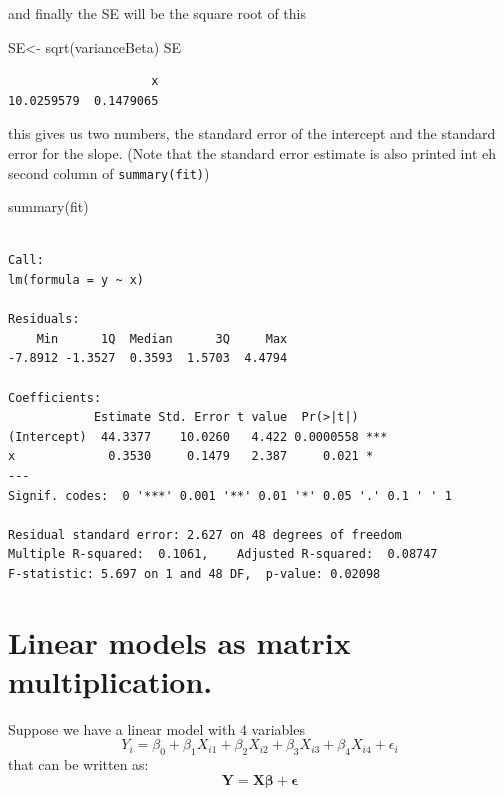 \documentclass[
  letterpaper,
  DIV=11,
  numbers=noendperiod]{scrartcl}
\newenvironment{Shaded}{\begin{snugshade}}{\end{snugshade}}
\newcommand{\FunctionTok}[1]{\textcolor[rgb]{0.28,0.35,0.67}{#1}}
\newcommand{\NormalTok}[1]{\textcolor[rgb]{0.00,0.23,0.31}{#1}}
\newcommand{\OtherTok}[1]{\textcolor[rgb]{0.00,0.23,0.31}{#1}}
\begin{document}
and finally the SE will be the square root of this

\begin{Shaded}
\begin{Highlighting}[]
\NormalTok{SE}\OtherTok{\textless{}{-}} \FunctionTok{sqrt}\NormalTok{(varianceBeta)}
\NormalTok{SE}
\end{Highlighting}
\end{Shaded}

\begin{verbatim}
                    x 
10.0259579  0.1479065 
\end{verbatim}

this gives us two numbers, the standard error of the intercept and the
standard error for the slope. (Note that the standard error estimate is
also printed int eh second column of \texttt{summary(fit)})

\begin{Shaded}
\begin{Highlighting}[]
\FunctionTok{summary}\NormalTok{(fit)}
\end{Highlighting}
\end{Shaded}

\begin{verbatim}

Call:
lm(formula = y ~ x)

Residuals:
    Min      1Q  Median      3Q     Max 
-7.8912 -1.3527  0.3593  1.5703  4.4794 

Coefficients:
            Estimate Std. Error t value  Pr(>|t|)    
(Intercept)  44.3377    10.0260   4.422 0.0000558 ***
x             0.3530     0.1479   2.387     0.021 *  
---
Signif. codes:  0 '***' 0.001 '**' 0.01 '*' 0.05 '.' 0.1 ' ' 1

Residual standard error: 2.627 on 48 degrees of freedom
Multiple R-squared:  0.1061,    Adjusted R-squared:  0.08747 
F-statistic: 5.697 on 1 and 48 DF,  p-value: 0.02098
\end{verbatim}

\section{Linear models as matrix
multiplication.}\label{linear-models-as-matrix-multiplication.}

Suppose we have a linear model with 4 variables \[ 
Y_i = \beta_0 + \beta_1 X_{i1} + \beta_2 X_{i2} + \beta_3 X_{i3} + \beta_4 X_{i4} + \epsilon_i
\] that can be written as: \[ 
\mathbf{Y} = \mathbf{X} \boldsymbol{\beta} + \boldsymbol{\epsilon} 
\]
\end{document}
